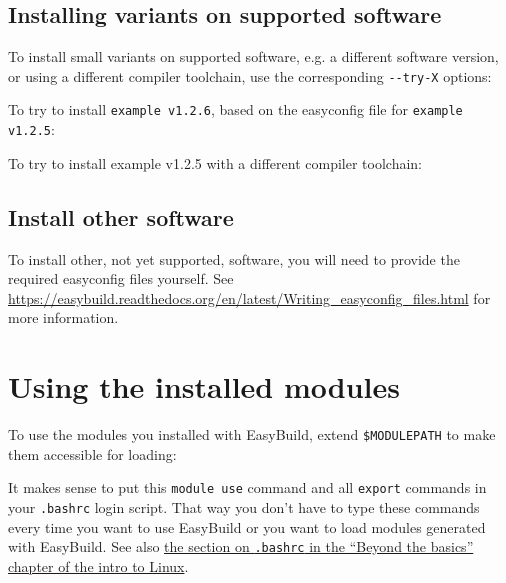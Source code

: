 \subsection{Installing variants on supported software}

To install small variants on supported software, e.g. a different software version,
or using a different compiler toolchain, use the corresponding \lstinline|--try-X| options:

To try to install \lstinline|example v1.2.6|, based on the easyconfig file for \lstinline|example v1.2.5|:

\begin{prompt}
\end{prompt}

To try to install example v1.2.5 with a different compiler toolchain:

\begin{prompt}
\end{prompt}

\subsection{Install other software}

To install other, not yet supported, software, you will need to provide the required
easyconfig files yourself. See \url{https://easybuild.readthedocs.org/en/latest/Writing_easyconfig_files.html}
for more information.

\section{Using the installed modules}

To use the modules you installed with EasyBuild, extend \lstinline|$MODULEPATH|
to make them accessible for loading:

\begin{prompt}
\end{prompt}

It makes sense to put this \lstinline|module use| command and all \lstinline|export|
commands in your \lstinline|.bashrc| login script. That way you don't have to type
these commands every time you want to use EasyBuild or you want to load modules generated
with EasyBuild. See also
\href{\LinuxManualURL#sec:bashrc-login-script}{the section on \texttt{.bashrc} in the ``Beyond the basics'' chapter of the intro to Linux}.
